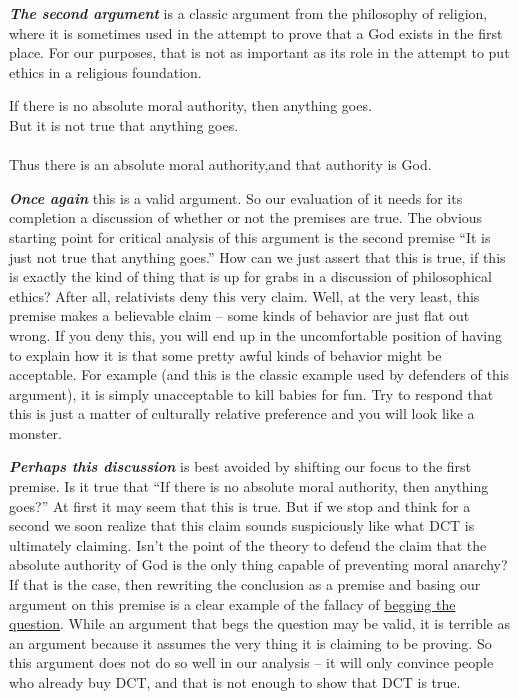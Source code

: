 \documentclass[12pt, openany]{book}
\begin{document}
\textbf{\emph{The second argument}} is a classic argument from the philosophy of religion, where it is sometimes used in the attempt to prove that a God exists in the first place. For our purposes, that is not as important as its role in the attempt to put ethics in a religious foundation.

\begin{center}

\begin{argument}

If there is no absolute moral authority, then anything goes.\\
But it is not true that anything goes.\\
~\\
Thus there is an absolute moral authority,and that authority is God.

\end{argument}

\end{center}

\textbf{\emph{Once again}} this is a valid argument. So our evaluation of it needs for its completion a discussion of whether or not the premises are true. The obvious starting point for critical analysis of this argument is the second premise ``It is just not true that anything goes.'' How can we just assert that this is true, if this is exactly the kind of thing that is up for grabs in a discussion of philosophical ethics? After all, relativists deny this very claim. Well, at the very least, this premise makes a believable claim -- some kinds of behavior are just flat out wrong. If you deny this, you will end up in the uncomfortable position of having to explain how it is that some pretty awful kinds of behavior might be acceptable. For example (and this is the classic example used by defenders of this argument), it is simply unacceptable to kill babies for fun. Try to respond that this is just a matter of culturally relative preference and you will look like a monster.

\textbf{\emph{Perhaps this discussion}} is best avoided by shifting our focus to the first premise. Is it true that ``If there is no absolute moral authority, then anything goes?'' At first it may seem that this is true. But if we stop and think for a second we soon realize that this claim sounds suspiciously like what DCT is ultimately claiming. Isn't the point of the theory to defend the claim that the absolute authority of God is the only thing capable of preventing moral anarchy? If that is the case, then rewriting the conclusion as a premise and basing our argument on this premise is a clear example of the fallacy of \protect\hyperlink{begging-the-question}{begging the question}. While an argument that begs the question may be valid, it is terrible as an argument because it assumes the very thing it is claiming to be proving. So this argument does not do so well in our analysis -- it will only convince people who already buy DCT, and that is not enough to show that DCT is true.
\end{document}
